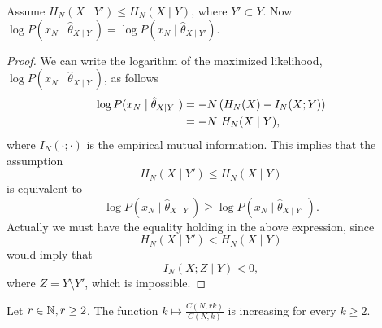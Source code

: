 \begin{lemma}
Assume $H_N(X \mid Y') \leq H_N(X \mid Y)$, where $Y' \subset Y$. Now $\log P(x_N \mid \hat{\theta}_{X\mid Y} \ ) = \log P(x_N \mid \hat{\theta}_{X\mid Y'})$.
\end{lemma}
\begin{proof}
We can write the logarithm of the maximized likelihood, \\ $\log P(x_N \mid \hat{\theta}_{X\mid Y} \ )$, as follows \citep{KOLLER}
\begin{align*}
\log P(x_N \mid \hat{\theta}_{X\mid Y} \ ) & = -N \left( H_N(X) - I_N(X;Y) \right) \\
&= -N \  H_N(X\mid Y),
\end{align*}where $I_N(\cdot;\cdot)$ is the empirical mutual information. This implies that the assumption
$$
H_N(X \mid Y') \leq H_N(X \mid Y)
$$ is equivalent to
$$
\log P(x_N \mid \hat{\theta}_{X\mid Y} \ ) \geq \log P(x_N \mid \hat{\theta}_{X\mid Y'} \ ) .
$$Actually we must have the equality holding in the above expression, since
$$
H_N(X \mid Y') < H_N(X \mid Y)
$$ would imply that
$$
I_N(X ; Z \mid Y ) < 0,
$$where $Z = Y \setminus Y'$, which is impossible.
\end{proof}
\begin{lemma}
Let $r \in \mathbb{N}, r \geq 2$.  The function $k \mapsto \frac{C(N,rk)}{C(N,k)}$ is increasing for every $k \geq 2$.
\end{lemma}

